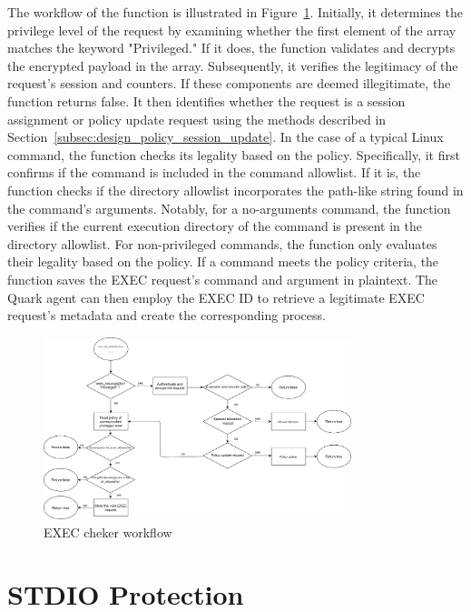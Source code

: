 The workflow of the function is illustrated in Figure~\ref{fig:exec_req_authentication_flow_chart}. Initially, it determines the privilege level of the request by examining whether the first element of the array matches the keyword "Privileged." If it does, the function validates and decrypts the 
encrypted payload in the array. Subsequently, it verifies the legitimacy of the request's session and counters. If these components are deemed illegitimate, the function returns false. It then identifies whether the request is a session assignment or policy update request using the methods described 
in Section~\ref{subsec:design_policy_session_update}. In the case of a typical Linux command, the function checks its legality based on the policy. Specifically, it first confirms if the command is included in the command allowlist. If it is, the function checks if the directory allowlist incorporates the path-like string found in the 
command's arguments. Notably, for a no-arguments command, the function verifies if the current execution directory of the command is present in the directory allowlist. For non-privileged commands, the function only evaluates their legality based on the policy. If a command meets the policy criteria, 
the function saves the EXEC request's command and argument in plaintext. The Quark agent can then employ the EXEC ID to retrieve a legitimate EXEC request's metadata and create the corresponding process.

\begin{figure}[!htb]
    \centering
    \includegraphics[width=0.8\textwidth]{images/exec_req_authentication_flow_chart.png}
    \caption[EXEC cheker workflow]{EXEC cheker workflow}
    \label{fig:exec_req_authentication_flow_chart}
\end{figure}

\section{STDIO Protection}
\label{sec:impl_STDIO}

